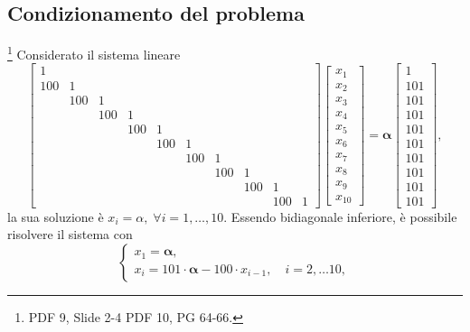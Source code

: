\subsection{Condizionamento del problema}\footnote{PDF 9, Slide 2-4 PDF 10, PG 64-66.}
Considerato il sistema lineare
\begin{equation}\label{eq:sistema_lineare_bidiagonale}
    \begin{bmatrix}
        1\\
        100 & 1\\
        & 100 & 1\\
        & & 100 & 1\\
        & & & 100 & 1\\
        & & & & 100 & 1\\
        & & & & & 100 & 1\\
        & & & & & & 100 & 1\\
        & & & & & & & 100 & 1\\
        & & & & & & & & 100 & 1
    \end{bmatrix}\begin{bmatrix}
        x_1\\
        x_2\\
        x_3\\
        x_4\\
        x_5\\
        x_6\\
        x_7\\
        x_8\\
        x_9\\
        x_{10}
    \end{bmatrix} = 
    \boldsymbol\alpha\begin{bmatrix}
        1\\
        101\\
        101\\
        101\\
        101\\
        101\\
        101\\
        101\\
        101\\
        101
    \end{bmatrix},
\end{equation}
la sua soluzione è $x_i=\alpha,\; \forall i = 1, \hdots, 10$. Essendo bidiagonale inferiore, è possibile risolvere il sistema con
\begin{equation*}
    \begin{cases}
        x_1 = \boldsymbol\alpha,\\
        x_i = 101\cdot\boldsymbol\alpha - 100\cdot x_{i-1},\quad i=2,\hdots10,
    \end{cases}
\end{equation*}
